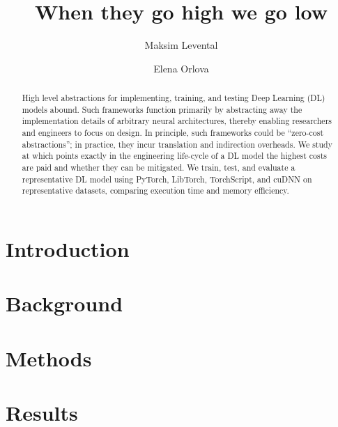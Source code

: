 \documentclass[sigconf]{acmart}
\begin{document}
\title{When they go high we go low}

\author{Maksim Levental}
\author{Elena Orlova}

\renewcommand{\shortauthors}{Levental and Orlova}

\begin{abstract}
  High level abstractions for implementing, training, and testing Deep Learning (DL) models abound.
  Such frameworks function primarily by abstracting away the implementation details of arbitrary neural architectures, thereby enabling researchers and engineers to focus on design.
  In principle, such frameworks could be ``zero-cost abstractions'';
  in practice, they incur translation and indirection overheads.
  We study at which points exactly in the engineering life-cycle of a DL model the highest costs are paid and whether they can be mitigated.
  We train, test, and evaluate a representative DL model using PyTorch, LibTorch, TorchScript, and cuDNN on representative datasets, comparing execution time and memory efficiency.
\end{abstract}


\maketitle

\section{Introduction}\label{sec:introduction}


\section{Background}\label{sec:background}


\section{Methods}\label{sec:methodology}


\section{Results}\label{sec:results}

\end{document}

